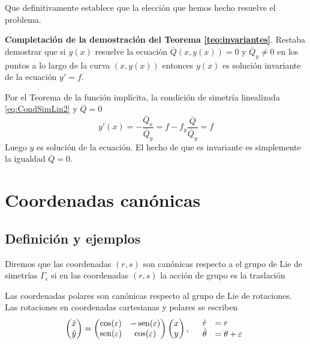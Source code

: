 Que definitivamente establece que la elección que hemos hecho resuelve el problema.

 
\textbf{Completación de la demostración  del Teorema \ref{teo:invariantes}}.
Restaba demostrar que si $y(x)$ resuelve la ecuación $\overline{Q}(x,y(x))=0$ y $\overline{Q}_y\neq 0$ en los puntos a lo largo de la curva $(x,y(x))$ entonces $y(x)$ es solución invariante de la ecuación $y'=f$. 

Por el Teorema de la función implícita,
la condición de simetría linealizada \eqref{eq:CondSimLin2} y $\overline{Q}=0$
\[y'(x)=-\frac{\overline{Q}_x}{\overline{Q}_y}=f-f_y\frac{\overline{Q}}{\overline{Q}_y}=f\]
Luego $y$ es solución de la ecuación. El hecho de que es invariante es simplemente la igualdad 
$\overline{Q}=0$.









\section{Coordenadas canónicas}

\subsection{Definición y ejemplos}
\begin{definicion}   Diremos que las coordenadas $(r,s)$ son canónicas respecto a el grupo de Lie de simetrías $\Gamma_{\epsilon}$  si en las coordenadas $(r,s)$ la acción de grupo es la traslación

\end{definicion}
 \begin{ejemplo}{} Las coordenadas polares son canónicas respecto al grupo de Lie de rotaciones. Las rotaciones en coordenadas cartesianas y polares se escriben
\[
 \begin{pmatrix} \hat{x}\\ \hat{y}
\end{pmatrix}=\begin{pmatrix} \cos(\varepsilon) & -\operatorname{sen}(\varepsilon)
\\ \operatorname{sen}(\varepsilon) & \cos(\varepsilon)
\end{pmatrix} \begin{pmatrix} x\\ y
\end{pmatrix},\quad \begin{array}{ll} \hat{r}&=r\\ \hat{\theta}&=\theta+\varepsilon\\ 
\end{array}
\]
\end{ejemplo}


